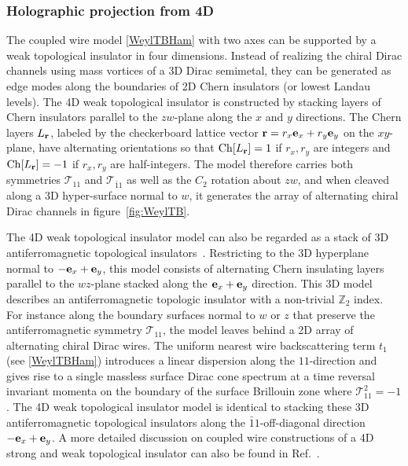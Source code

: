 \subsubsection{Holographic projection from 4D}\label{sec:holproj4D}
The coupled wire model \eqref{WeylTBHam} with two \AFTR axes can be supported by a weak topological insulator in four dimensions. Instead of realizing the chiral Dirac channels using mass vortices of a 3D Dirac semimetal, they can be generated as edge modes along the boundaries of 2D Chern insulators (or lowest Landau levels). The 4D weak topological insulator is constructed by stacking layers of Chern insulators parallel to the $zw$-plane along the $x$ and $y$ directions. The Chern layers $L_{\bf r}$, labeled by the checkerboard lattice vector ${\bf r}=r_x{\bf e}_x+r_y{\bf e}_y$ on the $xy$-plane, have alternating orientations so that $\mathrm{Ch}[L_{\bf r}]=1$ if $r_x,r_y$ are integers and $\mathrm{Ch}[L_{\bf r}]=-1$ if $r_x,r_y$ are half-integers.  The model therefore carries both \AFTR symmetries $\mathcal{T}_{11}$ and $\mathcal{T}_{\bar{1}1}$ as well as the $C_2$ rotation about $zw$, and when cleaved along a 3D hyper-surface normal to $w$, it generates the array of alternating chiral Dirac channels in figure~\ref{fig:WeylTB}.

The 4D weak topological insulator model can also be regarded as a stack of 3D antiferromagnetic topological insulators~\cite{MongEssinMoore10}. Restricting to the 3D hyperplane normal to $-{\bf e}_x+{\bf e}_y$, this model consists of alternating Chern insulating layers parallel to the $wz$-plane stacked along the ${\bf e}_x+{\bf e}_y$ direction. This 3D model describes an antiferromagnetic topologic insulator with a non-trivial $\mathbb{Z}_2$ index. For instance along the boundary surfaces normal to $w$ or $z$ that preserve the antiferromagnetic symmetry $\mathcal{T}_{11}$, the model leaves behind a 2D array of alternating chiral Dirac wires. The uniform nearest wire backscattering term $t_1$ (see \eqref{WeylTBHam}) introduces a linear dispersion along the $11$-direction and gives rise to a single massless surface Dirac cone spectrum at a time reversal invariant momenta on the boundary of the surface Brillouin zone where $\mathcal{T}_{11}^2=-1$. The 4D weak topological insulator model is identical to stacking these 3D antiferromagnetic topological insulators along the $\bar{1}1$-off-diagonal direction $-{\bf e}_x+{\bf e}_y$. A more detailed discussion on coupled wire constructions of a 4D strong and weak topological insulator can also be found in Ref.~.

